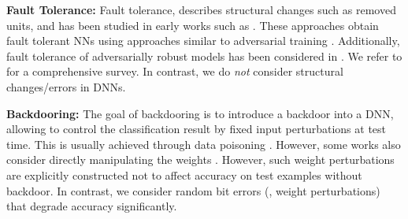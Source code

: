 \textbf{Fault Tolerance:} Fault tolerance, describes structural changes such as removed units, and has been studied in early works such as \citep{AlippiISCAS1994,NetiTNN1992,Chiu1994}. These approaches obtain fault tolerant NNs using approaches similar to adversarial training \citep{DeodhareTNN1998,LeeICASSP2014}.
Additionally, fault tolerance of adversarially robust models has been considered in \citep{DudduARXIV2019b}. We refer to \citep{TorreshuitzilIEEEACCESS2017} for a comprehensive survey. In contrast, we do \emph{not} consider structural changes/errors in DNNs.

\textbf{Backdooring:} The goal of backdooring is to introduce a backdoor into a DNN, allowing to control the classification result by fixed input perturbations at test time. This is usually achieved through data poisoning  \citep{LiuNDSS2018,LiaoARXIV2018,ZhangASIACCS2018}. However, some works also consider directly manipulating the weights \citep{JiCCS2018,DumfordARXIV2018}. However, such weight perturbations are explicitly constructed not to affect accuracy on test examples without backdoor. In contrast, we consider random bit errors (\ie, weight perturbations) that degrade accuracy significantly.